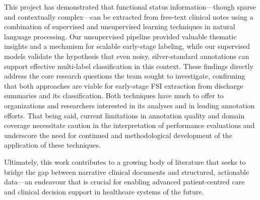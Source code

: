 This project has demonstrated that functional status information—though sparse and contextually complex—can be extracted from free-text clinical notes using a combination of supervised and unsupervised learning techniques in natural language processing. Our unsupervised pipeline provided valuable thematic insights and a mechanism for scalable early-stage labeling, while our supervised models validate the hypothesis that even noisy, silver-standard annotations can support effective multi-label classification in this context.
\medskip
These findings directly address the core research questions the team sought to investigate, confirming that both approaches are viable for early-stage FSI extraction from discharge summaries and its classification. Both techniques have much to offer to organizations and researchers interested in its analyses and in leading annotation efforts. That being said, current limitations in annotation quality and domain coverage necessitate caution in the interpretation of performance evaluations and underscore the need for continued and methodological development of the application of these techniques.\medskip

Ultimately, this work contributes to a growing body of literature that seeks to bridge the gap between narrative clinical documents and structured, actionable data—an endeavour that is crucial for enabling advanced patient-centred care and clinical decision support in healthcare systems of the future.